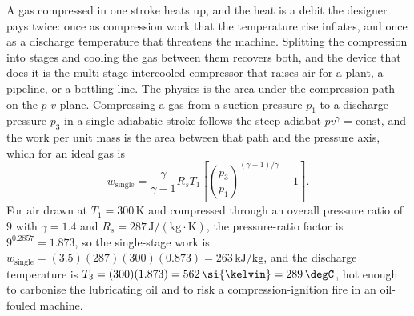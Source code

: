 A gas compressed in one stroke heats up, and the heat is a debit the designer
pays twice: once as compression work that the temperature rise inflates, and
once as a discharge temperature that threatens the machine. Splitting the
compression into stages and cooling the gas between them recovers both, and the
device that does it is the multi-stage intercooled compressor that raises air
for a plant, a pipeline, or a bottling line. The physics is the area under the
compression path on the $p$-$v$ plane. Compressing a gas from a suction
pressure $p_1$ to a discharge pressure $p_3$ in a single adiabatic stroke
follows the steep adiabat $p v^{\gamma} = \text{const}$, and the work per unit
mass is the area between that path and the pressure axis, which for an ideal gas
is
\[
w_{\text{single}} = \frac{\gamma}{\gamma - 1} R_s T_1\left[\left(\frac{p_3}{p_1}
\right)^{(\gamma - 1)/\gamma} - 1\right].
\]
For air drawn at $T_1 = 300\,\si{\kelvin}$ and compressed through an overall
pressure ratio of $9$ with $\gamma = 1.4$ and $R_s = 287\,\text{J}/(\text{kg}
\cdot\si{\kelvin})$, the pressure-ratio factor is $9^{0.2857} = 1.873$, so the
single-stage work is $w_{\text{single}} = (3.5)(287)(300)(0.873) = 263\,
\text{kJ}/\text{kg}$, and the discharge temperature is $T_3 = (300)(1.873) =
562\,\si{\kelvin} = 289\,\degC$, hot enough to carbonise the lubricating oil
and to risk a compression-ignition fire in an oil-fouled machine.

